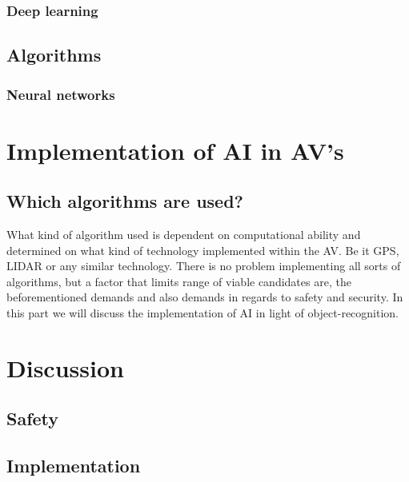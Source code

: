 \documentclass[conference]{IEEEtran}
\begin{document}
	
	 
	 \subsubsection{Deep learning}
 \subsection{Algorithms}
	 \subsubsection{Neural networks}

\section{Implementation of AI in AV's} %
 \subsection{Which algorithms are used?}
	 What kind of algorithm used is dependent on computational ability and determined on what kind of technology
	 implemented within the AV. Be it GPS, LIDAR or any similar technology. There is no problem
	 implementing all sorts of algorithms, but a factor that limits range of viable candidates
	 are, the beforementioned demands and also demands in regards to safety and security.
	 In this part we will discuss the implementation of AI in light of object-recognition.

	\subsection{}


\section{Discussion}
 \subsection{Safety}
 \subsection{Implementation}
\end{document}
